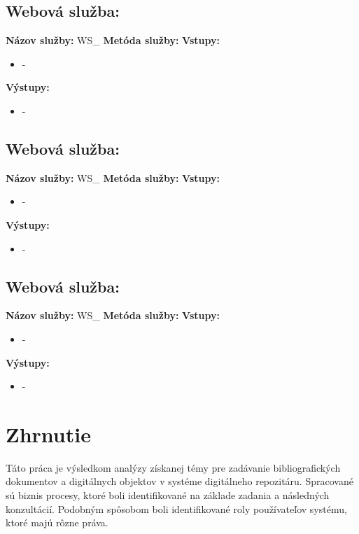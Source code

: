 \documentclass[10pt,oneside,slovak,a4paper]{article}
\begin{document}
\subsection{Webová služba: }
\textbf{Názov služby:} WS\_
\textbf{Metóda služby:} 
\textbf{Vstupy:}
	\begin{itemize}
		\item \textit{} - 
	\end{itemize}
\textbf{Výstupy:}
	\begin{itemize}
		\item \textit{} - 
	\end{itemize}
	
\subsection{Webová služba: }
\textbf{Názov služby:} WS\_
\textbf{Metóda služby:} 
\textbf{Vstupy:}
	\begin{itemize}
		\item \textit{} - 
	\end{itemize}
\textbf{Výstupy:}
	\begin{itemize}
		\item \textit{} - 
	\end{itemize}
	
\subsection{Webová služba: }
\textbf{Názov služby:} WS\_
\textbf{Metóda služby:} 
\textbf{Vstupy:}
	\begin{itemize}
		\item \textit{} - 
	\end{itemize}
\textbf{Výstupy:}
	\begin{itemize}
		\item \textit{} - 
	\end{itemize}
	
	
	
	



\newpage

\section{Zhrnutie}
Táto práca je výsledkom analýzy získanej témy pre zadávanie bibliografických dokumentov a digitálnych objektov v systéme digitálneho repozitáru. Spracované sú biznis procesy, ktoré boli identifikované na základe zadania a následných konzultácií. Podobným spôsobom boli identifikované roly používateľov systému, ktoré majú rôzne práva. 
\end{document}
